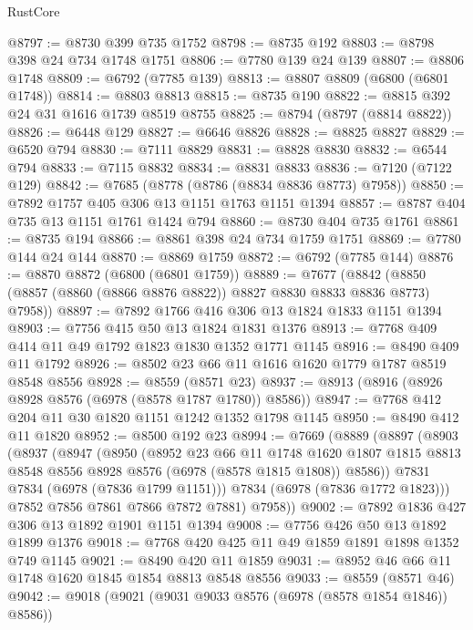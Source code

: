 \begin{lexlean}{RustCore}
\begin{coremodule}
@8797 := @8730 @399 @735 @1752
@8798 := @8735 @192
@8803 := @8798 @398 @24 @734 @1748 @1751
@8806 := @7780 @139 @24 @139
@8807 := @8806 @1748
@8809 := @6792 (@7785 @139)
@8813 := @8807 @8809 (@6800 (@6801 @1748))
@8814 := @8803 @8813
@8815 := @8735 @190
@8822 := @8815 @392 @24 @31 @1616 @1739 @8519 @8755
@8825 := @8794 (@8797 (@8814 @8822))
@8826 := @6448 @129
@8827 := @6646 @8826
@8828 := @8825 @8827
@8829 := @6520 @794
@8830 := @7111 @8829
@8831 := @8828 @8830
@8832 := @6544 @794
@8833 := @7115 @8832
@8834 := @8831 @8833
@8836 := @7120 (@7122 @129)
@8842 := @7685 (@8778 (@8786 (@8834 @8836 @8773) @7958))
@8850 := @7892 @1757 @405 @306 @13 @1151 @1763 @1151 @1394
@8857 := @8787 @404 @735 @13 @1151 @1761 @1424 @794
@8860 := @8730 @404 @735 @1761
@8861 := @8735 @194
@8866 := @8861 @398 @24 @734 @1759 @1751
@8869 := @7780 @144 @24 @144
@8870 := @8869 @1759
@8872 := @6792 (@7785 @144)
@8876 := @8870 @8872 (@6800 (@6801 @1759))
@8889 := @7677
    (@8842 (@8850 (@8857 (@8860 (@8866 @8876 @8822)) @8827 @8830 @8833 @8836 @8773) @7958))
@8897 := @7892 @1766 @416 @306 @13 @1824 @1833 @1151 @1394
@8903 := @7756 @415 @50 @13 @1824 @1831 @1376
@8913 := @7768 @409 @414 @11 @49 @1792 @1823 @1830 @1352 @1771 @1145
@8916 := @8490 @409 @11 @1792
@8926 := @8502 @23 @66 @11 @1616 @1620 @1779 @1787 @8519 @8548 @8556
@8928 := @8559 (@8571 @23)
@8937 := @8913 (@8916 (@8926 @8928 @8576 (@6978 (@8578 @1787 @1780)) @8586))
@8947 := @7768 @412 @204 @11 @30 @1820 @1151 @1242 @1352 @1798 @1145
@8950 := @8490 @412 @11 @1820
@8952 := @8500 @192 @23
@8994 := @7669
    (@8889
      (@8897
        (@8903
          (@8937
            (@8947
              (@8950
                (@8952
                  @23
                  @66
                  @11
                  @1748
                  @1620
                  @1807
                  @1815
                  @8813
                  @8548
                  @8556
                  @8928
                  @8576
                  (@6978 (@8578 @1815 @1808))
                  @8586))
              @7831
              @7834
              (@6978 (@7836 @1799 @1151)))
            @7834
            (@6978 (@7836 @1772 @1823)))
          @7852
          @7856
          @7861
          @7866
          @7872
          @7881)
        @7958))
@9002 := @7892 @1836 @427 @306 @13 @1892 @1901 @1151 @1394
@9008 := @7756 @426 @50 @13 @1892 @1899 @1376
@9018 := @7768 @420 @425 @11 @49 @1859 @1891 @1898 @1352 @749 @1145
@9021 := @8490 @420 @11 @1859
@9031 := @8952 @46 @66 @11 @1748 @1620 @1845 @1854 @8813 @8548 @8556
@9033 := @8559 (@8571 @46)
@9042 := @9018 (@9021 (@9031 @9033 @8576 (@6978 (@8578 @1854 @1846)) @8586))

\end{coremodule}
\end{lexlean}
